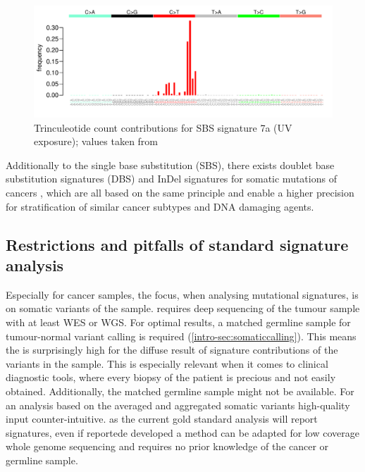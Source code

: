 \begin{figure}[!ht]
\centering
\includegraphics[width=.99\linewidth]{Figures/MisMatchFinder/SBS7aSignature.pdf}
\caption[Trinculeotide count contributions for single base substitution (SBS) signature 7a]{Trinculeotide count contributions for SBS signature 7a (UV exposure); values taken from \protect\textcite{Alexandrov2020}}\label{fig:sig7a}
\end{figure}

Additionally to the single base substitution (SBS), there exists doublet base substitution signatures (DBS) and InDel signatures for somatic mutations of cancers \cite{Alexandrov2020}, which are all based on the same principle and enable a higher precision for stratification of similar cancer subtypes and DNA damaging agents.

\subsection{Restrictions and pitfalls of standard signature analysis}
Especially for cancer samples, the focus, when analysing mutational signatures, is on somatic variants of the sample.  requires deep sequencing of the tumour sample with at least WES or WGS. For optimal results, a  matched germline sample for tumour-normal variant calling is required (\autoref{intro-sec:somaticcalling}). This means the  is surprisingly high for the diffuse result of signature contributions of the variants in the sample. This is especially relevant when it comes to clinical diagnostic tools, where every biopsy of the patient is precious and not easily obtained. Additionally, the matched germline sample might not be available. For an analysis based on the averaged and aggregated somatic variants high-quality input  counter-intuitive.  as the current gold standard analysis will report signatures, even if  reportede  developed a method  can be adapted for low coverage whole genome sequencing and requires no prior knowledge of the cancer or  germline sample. 

